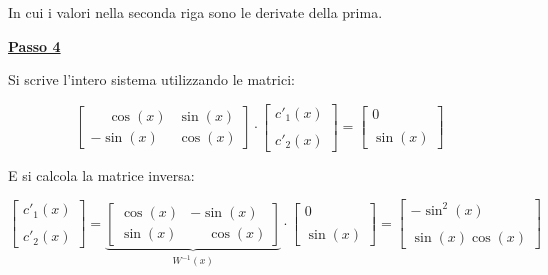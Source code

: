 \documentclass[a4paper]{article}
\begin{document}
	\noindent
	In cui i valori nella seconda riga sono le derivate della prima.\newline
	
	\noindent
	\textcolor{Red3}{\textbf{\underline{Passo 4}}}\newline
	
	\noindent
	Si scrive l'intero sistema utilizzando le matrici:
	
	\begin{equation*}
		\begin{bmatrix}
			\phantom{-}\cos\left(x\right)	&	\sin\left(x\right) \\
			-\sin\left(x\right)				&	\cos\left(x\right)
		\end{bmatrix}
		\cdot
		\begin{bmatrix}
			c'_{1}\left(x\right) \\
			\\
			c'_{2}\left(x\right)
		\end{bmatrix}
		=
		\begin{bmatrix}
			0 \\
			\\
			\sin\left(x\right)
		\end{bmatrix}
	\end{equation*}

	\noindent
	E si calcola la matrice inversa:
	
	\begin{equation*}
		\begin{bmatrix}
			c'_{1}\left(x\right) \\
			\\
			c'_{2}\left(x\right)
		\end{bmatrix}
		=
		\underbrace{
			\begin{bmatrix}
				\cos\left(x\right)	&	-\sin\left(x\right) \\
				\sin\left(x\right)	&	\phantom{-}\cos\left(x\right)
			\end{bmatrix}
		}_{W^{-1}\left(x\right)}
		\cdot
		\begin{bmatrix}
			0 \\
			\\
			\sin\left(x\right)
		\end{bmatrix}
		=
		\begin{bmatrix}
			-\sin^{2}\left(x\right) \\
			\\
			\sin\left(x\right)\cos\left(x\right)
		\end{bmatrix}
	\end{equation*}
\end{document}
